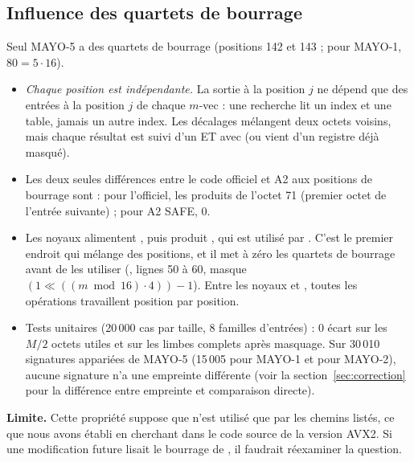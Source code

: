 \subsection{Influence des quartets de bourrage}\label{sec:bourrage}
Seul MAYO-5 a des quartets de bourrage (positions 142 et 143 ; pour MAYO-1, $80=5\cdot16$).
\begin{itemize}
\item \Pc{} \emph{Chaque position est indépendante.} La sortie à la position $j$ ne dépend que des entrées à la position $j$ de chaque $m$-vec : une recherche lit un index et une table, jamais un autre index. Les décalages  mélangent deux octets voisins, mais chaque résultat est suivi d'un ET avec  (ou vient d'un registre déjà masqué).
\item \Pc{} Les deux seules différences entre le code officiel et A2 aux positions de bourrage sont : pour l'officiel, les produits de l'octet 71 (premier octet de l'entrée suivante) ; pour A2 SAFE, 0.
\item \Pc{} Les noyaux alimentent , puis  produit , qui est utilisé par . C'est le premier endroit qui mélange des positions, et il met à zéro les quartets de bourrage avant de les utiliser (, lignes 50 à 60, masque $(1\ll((m\bmod16)\cdot4))-1$). Entre les noyaux et , toutes les opérations travaillent position par position.
\item \Pe{} Tests unitaires (20\,000 cas par taille, 8 familles d'entrées) : 0 écart sur les $M/2$ octets utiles et sur les limbes complets après masquage. Sur 30\,010 signatures appariées de MAYO-5 (15\,005 pour MAYO-1 et pour MAYO-2), aucune signature n'a une empreinte différente (voir la section~\ref{sec:correction} pour la différence entre empreinte et comparaison directe).
\end{itemize}
\textbf{Limite.} Cette propriété suppose que  n'est utilisé que par les chemins listés, ce que nous avons établi en cherchant dans le code source de la version AVX2. Si une modification future lisait le bourrage de , il faudrait réexaminer la question.

